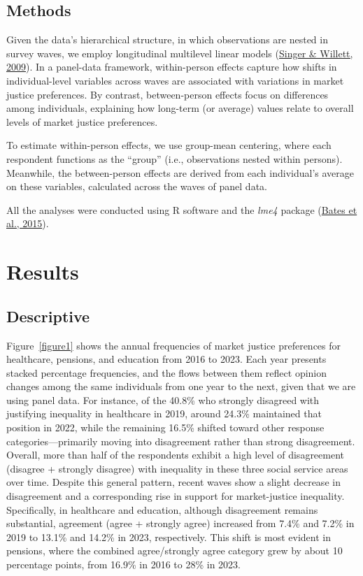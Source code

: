 \documentclass[
  12pt,
]{article}
\begin{document}
\hypertarget{methods}{%
\subsection{Methods}\label{methods}}

Given the data's hierarchical structure, in which observations are
nested in survey waves, we employ longitudinal multilevel linear models
(\protect\hyperlink{ref-singer_applied_2009}{Singer \& Willett, 2009}).
In a panel-data framework, within-person effects capture how shifts in
individual-level variables across waves are associated with variations
in market justice preferences. By contrast, between-person effects focus
on differences among individuals, explaining how long-term (or average)
values relate to overall levels of market justice preferences.

To estimate within-person effects, we use group-mean centering, where
each respondent functions as the ``group'' (i.e., observations nested
within persons). Meanwhile, the between-person effects are derived from
each individual's average on these variables, calculated across the
waves of panel data.

All the analyses were conducted using R software and the \emph{lme4}
package (\protect\hyperlink{ref-bates_fitting_2015}{Bates et al.,
2015}).

\hypertarget{results}{%
\section{Results}\label{results}}

\hypertarget{descriptive}{%
\subsection{Descriptive}\label{descriptive}}

Figure~\ref{figure1} shows the annual frequencies of market justice
preferences for healthcare, pensions, and education from 2016 to 2023.
Each year presents stacked percentage frequencies, and the flows between
them reflect opinion changes among the same individuals from one year to
the next, given that we are using panel data. For instance, of the
40.8\% who strongly disagreed with justifying inequality in healthcare
in 2019, around 24.3\% maintained that position in 2022, while the
remaining 16.5\% shifted toward other response categories---primarily
moving into disagreement rather than strong disagreement. Overall, more
than half of the respondents exhibit a high level of disagreement
(disagree + strongly disagree) with inequality in these three social
service areas over time. Despite this general pattern, recent waves show
a slight decrease in disagreement and a corresponding rise in support
for market-justice inequality. Specifically, in healthcare and
education, although disagreement remains substantial, agreement (agree +
strongly agree) increased from 7.4\% and 7.2\% in 2019 to 13.1\% and
14.2\% in 2023, respectively. This shift is most evident in pensions,
where the combined agree/strongly agree category grew by about 10
percentage points, from 16.9\% in 2016 to 28\% in 2023.
\end{document}
